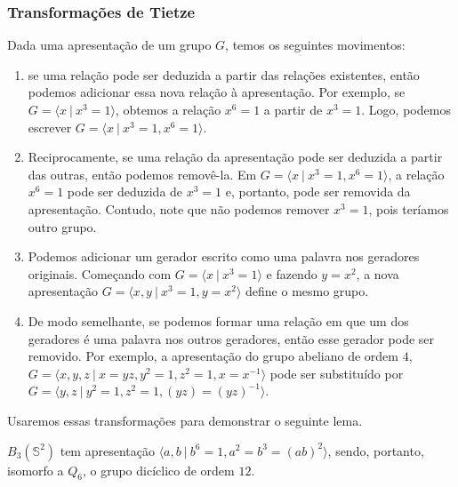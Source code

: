 	\subsubsection{Transformações de Tietze}
	Dada uma apresentação de um grupo $G$, temos os seguintes movimentos:
	\begin{enumerate}
		\item se uma relação pode ser deduzida a partir das relações existentes, 
		então podemos adicionar essa nova relação à apresentação. Por exemplo, 
		se $G = \langle x \ | \ x^3=1 \rangle$, obtemos a relação $x^6 = 1$ a partir de $x^3=1$. 
		Logo, podemos escrever $G = \langle x \ | \ x^3=1,x^6=1 \rangle$.
		
		\item Reciprocamente, se uma relação da apresentação pode ser deduzida a partir das outras, 
		então podemos removê-la. Em $G = \langle x \ | \ x^3=1,x^6=1 \rangle$, a relação $x^6=1$ pode ser 
		deduzida de $x^3=1$ e, portanto, pode ser removida da apresentação. Contudo, note que 
		não podemos remover $x^3=1$, pois teríamos outro grupo.
		
		\item Podemos adicionar um gerador escrito como uma palavra nos geradores originais. 
		Começando com $G = \langle x \ | \ x^3=1 \rangle$ e fazendo $y=x^2$, a nova apresentação 
		$G = \langle x,y \ | \ x^3=1,y=x^2 \rangle$ define o mesmo grupo.
		
		\item De modo semelhante, se podemos formar uma relação em que um dos geradores é uma 
		palavra nos outros geradores, então esse gerador pode ser removido. Por exemplo, a 
		apresentação do grupo abeliano de ordem $4$, 
		$G = \langle x,y,z \ | \ x=yz, y^2=1, z^2=1, x=x^{-1} \rangle$ 
		pode ser substituído por $G = \langle y,z \ | \ y^2=1,z^2=1,(yz)=(yz)^{-1} \rangle$.
	\end{enumerate}
	Usaremos essas transformações para demonstrar o seguinte lema.
	\begin{lemma}
	\label{B_3(S^2) tem ordem 12}
		$B_3(\mathbb{S}^2)$ tem apresentação $\langle a,b \ | \ b^6=1,a^2=b^3=(ab)^2 \rangle$, 
		sendo, portanto, isomorfo a $Q_6$, o grupo dicíclico de ordem $12$. 
	\end{lemma} 
